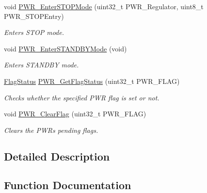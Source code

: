 \begin{DoxyCompactItemize}
void \hyperlink{group___p_w_r___private___functions_ga694676ac06a9baf50eae45adae0118ab}{P\+W\+R\+\_\+\+Enter\+S\+T\+O\+P\+Mode} (uint32\+\_\+t P\+W\+R\+\_\+\+Regulator, uint8\+\_\+t P\+W\+R\+\_\+\+S\+T\+O\+P\+Entry)
\begin{DoxyCompactList}\small\item\em Enters S\+T\+OP mode. \end{DoxyCompactList}\item 
void \hyperlink{group___p_w_r___private___functions_ga00ddae00a9c327b81b24d2597b0052f3}{P\+W\+R\+\_\+\+Enter\+S\+T\+A\+N\+D\+B\+Y\+Mode} (void)
\begin{DoxyCompactList}\small\item\em Enters S\+T\+A\+N\+D\+BY mode. \end{DoxyCompactList}\item 
\hyperlink{group___exported__types_ga89136caac2e14c55151f527ac02daaff}{Flag\+Status} \hyperlink{group___p_w_r___private___functions_gaa980163a4d83304280ee34942464b4ec}{P\+W\+R\+\_\+\+Get\+Flag\+Status} (uint32\+\_\+t P\+W\+R\+\_\+\+F\+L\+AG)
\begin{DoxyCompactList}\small\item\em Checks whether the specified P\+WR flag is set or not. \end{DoxyCompactList}\item 
void \hyperlink{group___p_w_r___private___functions_ga01c4b2fbd16514b993324e101c3ddf7c}{P\+W\+R\+\_\+\+Clear\+Flag} (uint32\+\_\+t P\+W\+R\+\_\+\+F\+L\+AG)
\begin{DoxyCompactList}\small\item\em Clears the P\+WR\textquotesingle{}s pending flags. \end{DoxyCompactList}\end{DoxyCompactItemize}


\subsection{Detailed Description}


\subsection{Function Documentation}
\mbox{\label{group___p_w_r___private___functions_ga0741aea35572b1a75f82b74de12df800}} 
